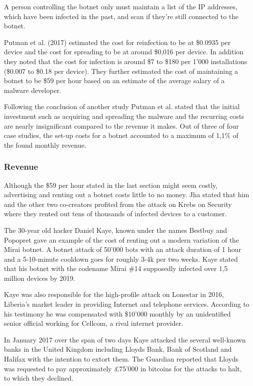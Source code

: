 A person controlling the botnet only must maintain a list of the IP addresses, which have been infected in the past, and scan if they're still connected to the botnet. 

Putman et al. (2017) estimated the cost for reinfection to be at \$0.0935 per device and the cost for spreading to be at around \$0,016 per device. In addition they noted that the cost for infection is around \$7 to \$180 per 1'000 installations (\$0.007 to \$0.18 per device). They further estimated the cost of maintaining a botnet to be \$59 per hour based on an estimate of the average salary of a malware developer. \cite{Putman}

Following the conclusion of another study Putman et al. stated that the initial investment such as acquiring and spreading the malware and the recurring costs are nearly insignificant compared to the revenue it makes. Out of three of four case studies, the set-up costs for a botnet accounted to a maximum of 1,1\% of the found monthly revenue. \cite{Putman}

	\subsubsection{Revenue}
	Although the \$59 per hour stated in the last section might seem costly, advertising and renting out a botnet costs little to no money. Jha stated that him and the other two co-creators profited from the attack on Krebs on Security where they rented out tens of thousands of infected devices to a customer. \cite{Krebs20}
	
The 30-year old hacker Daniel Kaye, known under the names Bestbuy and Popopret gave an example of the cost of renting out a modern variation of the Mirai botnet. A botnet attack of 50'000 bots with an attack duration of 1 hour and a 5-10-minute cooldown goes for roughly 3-4k per two weeks. \cite{Paganini16} Kaye stated that his botnet with the codename Mirai \#14 supposedly infected over 1,5 million devices by 2019. \cite{Cimpanu17}

Kaye was also responsible for the high-profile attack on Lonestar in 2016, Liberia's market leader in providing Internet and telephone services. According to his testimony he was compensated with \$10'000 monthly by an unidentified senior official working for Cellcom, a rival internet provider. \cite{Krebs21}

In January 2017 over the span of two days Kaye attacked the several well-known banks in the United Kingdom including Lloyds Bank, Bank of Scotland and Halifax with the intention to extort them. The Guardian reported that Lloyds was requested to pay approximately \pounds 75'000 in bitcoins for the attacks to halt, to which they declined. \cite{Collison17}

